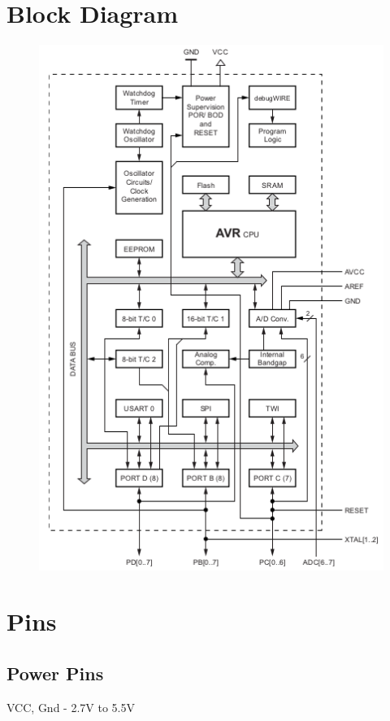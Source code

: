 \documentclass{article}
\begin{document}
\newpage
\section{Block Diagram}
\begin{figure}[H]
    \centering
    \includegraphics{blockDiagram.png}
\end{figure}

\newpage
\section{Pins}
\subsection{Power Pins}
\quad VCC, Gnd - 2.7V to 5.5V
\end{document}
